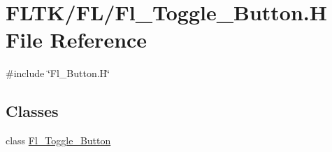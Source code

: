 \hypertarget{_fl___toggle___button_8_h}{}\section{F\+L\+T\+K/\+F\+L/\+Fl\+\_\+\+Toggle\+\_\+\+Button.H File Reference}
\label{_fl___toggle___button_8_h}
{\ttfamily \#include \char`\"{}Fl\+\_\+\+Button.\+H\char`\"{}}\newline
\subsection*{Classes}
\begin{DoxyCompactItemize}
\item 
class \hyperlink{class_fl___toggle___button}{Fl\+\_\+\+Toggle\+\_\+\+Button}
\end{DoxyCompactItemize}
